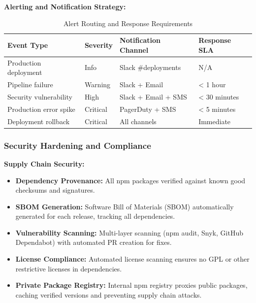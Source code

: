 \documentclass[12pt,a4paper]{article}
\begin{document}
\textbf{Alerting and Notification Strategy:}

\begin{table}[H]
\centering
\small
\begin{tabular}{|p{4cm}|p{3cm}|p{3cm}|p{3cm}|}
\hline
\textbf{Event Type} & \textbf{Severity} & \textbf{Notification Channel} & \textbf{Response SLA} \\
\hline
Production deployment & Info & Slack \#deployments & N/A \\
\hline
Pipeline failure & Warning & Slack + Email & < 1 hour \\
\hline
Security vulnerability & High & Slack + Email + SMS & < 30 minutes \\
\hline
Production error spike & Critical & PagerDuty + SMS & < 5 minutes \\
\hline
Deployment rollback & Critical & All channels & Immediate \\
\hline
\end{tabular}
\caption{Alert Routing and Response Requirements}
\end{table}

\subsubsection{Security Hardening and Compliance}

\textbf{Supply Chain Security:}

\begin{itemize}[leftmargin=2em, itemsep=6pt]
    \item \textbf{Dependency Provenance:} All npm packages verified against known good checksums and signatures.
    \item \textbf{SBOM Generation:} Software Bill of Materials (SBOM) automatically generated for each release, tracking all dependencies.
    \item \textbf{Vulnerability Scanning:} Multi-layer scanning (npm audit, Snyk, GitHub Dependabot) with automated PR creation for fixes.
    \item \textbf{License Compliance:} Automated license scanning ensures no GPL or other restrictive licenses in dependencies.
    \item \textbf{Private Package Registry:} Internal npm registry proxies public packages, caching verified versions and preventing supply chain attacks.
\end{itemize}

\vspace{0.5em}
\end{document}
